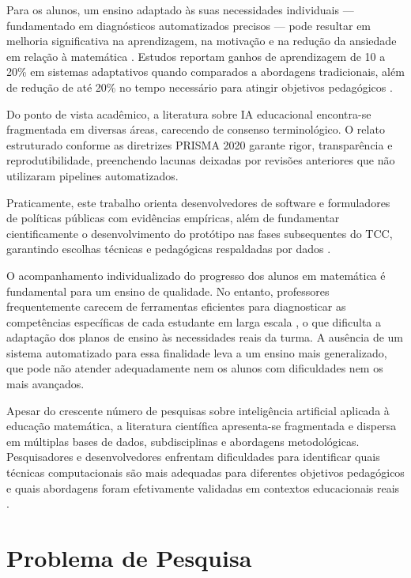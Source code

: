 Para os alunos, um ensino adaptado às suas necessidades individuais — fundamentado em diagnósticos automatizados precisos — pode resultar em melhoria significativa na aprendizagem, na motivação e na redução da ansiedade em relação à matemática \cite{Assessing2024_015}. Estudos reportam ganhos de aprendizagem de 10 a 20\% em sistemas adaptativos quando comparados a abordagens tradicionais, além de redução de até 20\% no tempo necessário para atingir objetivos pedagógicos \cite{Design2025_004}.

Do ponto de vista acadêmico, a literatura sobre IA educacional encontra-se fragmentada em diversas áreas, carecendo de consenso terminológico. O relato estruturado conforme as diretrizes PRISMA 2020 garante rigor, transparência e reprodutibilidade, preenchendo lacunas deixadas por revisões anteriores que não utilizaram pipelines automatizados.

Praticamente, este trabalho orienta desenvolvedores de software e formuladores de políticas públicas com evidências empíricas, além de fundamentar cientificamente o desenvolvimento do protótipo nas fases subsequentes do TCC, garantindo escolhas técnicas e pedagógicas respaldadas por dados \cite{Data2020_011, Machine2024_009}.

O acompanhamento individualizado do progresso dos alunos em matemática é fundamental para um ensino de qualidade. No entanto, professores frequentemente carecem de ferramentas eficientes para diagnosticar as competências específicas de cada estudante em larga escala \cite{Analysis2022_003}, o que dificulta a adaptação dos planos de ensino às necessidades reais da turma. A ausência de um sistema automatizado para essa finalidade leva a um ensino mais generalizado, que pode não atender adequadamente nem os alunos com dificuldades nem os mais avançados.

Apesar do crescente número de pesquisas sobre inteligência artificial aplicada à educação matemática, a literatura científica apresenta-se fragmentada e dispersa em múltiplas bases de dados, subdisciplinas e abordagens metodológicas. Pesquisadores e desenvolvedores enfrentam dificuldades para identificar quais técnicas computacionais são mais adequadas para diferentes objetivos pedagógicos e quais abordagens foram efetivamente validadas em contextos educacionais reais \cite{Computational2017_008}.

\section{Problema de Pesquisa}


